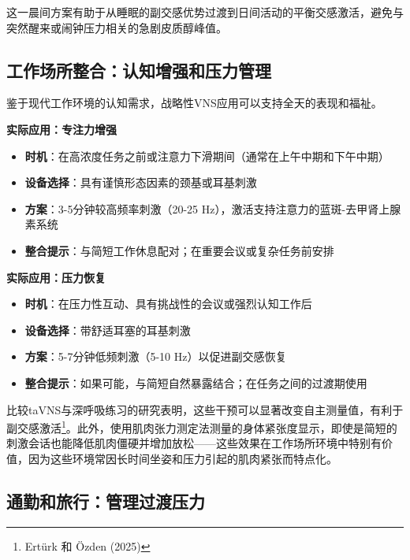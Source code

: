 \documentclass[
  Letterpaper,
]{scrbook}
\providecommand{\tightlist}{%
  \setlength{\itemsep}{0pt}\setlength{\parskip}{0pt}}\usepackage{longtable,booktabs,array}
\begin{document}
这一晨间方案有助于从睡眠的副交感优势过渡到日间活动的平衡交感激活，避免与突然醒来或闹钟压力相关的急剧皮质醇峰值。

\subsection{工作场所整合：认知增强和压力管理}\label{ux5de5ux4f5cux573aux6240ux6574ux5408ux8ba4ux77e5ux589eux5f3aux548cux538bux529bux7ba1ux7406}

鉴于现代工作环境的认知需求，战略性VNS应用可以支持全天的表现和福祉。

\textbf{实际应用：专注力增强}

\begin{itemize}
\tightlist
\item
  \textbf{时机}：在高浓度任务之前或注意力下滑期间（通常在上午中期和下午中期）
\item
  \textbf{设备选择}：具有谨慎形态因素的颈基或耳基刺激
\item
  \textbf{方案}：3-5分钟较高频率刺激（20-25
  Hz），激活支持注意力的蓝斑-去甲肾上腺素系统
\item
  \textbf{整合提示}：与简短工作休息配对；在重要会议或复杂任务前安排
\end{itemize}

\textbf{实际应用：压力恢复}

\begin{itemize}
\tightlist
\item
  \textbf{时机}：在压力性互动、具有挑战性的会议或强烈认知工作后
\item
  \textbf{设备选择}：带舒适耳塞的耳基刺激
\item
  \textbf{方案}：5-7分钟低频刺激（5-10 Hz）以促进副交感恢复
\item
  \textbf{整合提示}：如果可能，与简短自然暴露结合；在任务之间的过渡期使用
\end{itemize}

比较taVNS与深呼吸练习的研究表明，这些干预可以显著改变自主测量值，有利于副交感激活\footnote{Ertürk
  和 Özden (2025)}。此外，使用肌肉张力测定法测量的身体紧张度显示，即使是简短的刺激会话也能降低肌肉僵硬并增加放松------这些效果在工作场所环境中特别有价值，因为这些环境常因长时间坐姿和压力引起的肌肉紧张而特点化。

\subsection{通勤和旅行：管理过渡压力}\label{ux901aux52e4ux548cux65c5ux884cux7ba1ux7406ux8fc7ux6e21ux538bux529b}
\end{document}

